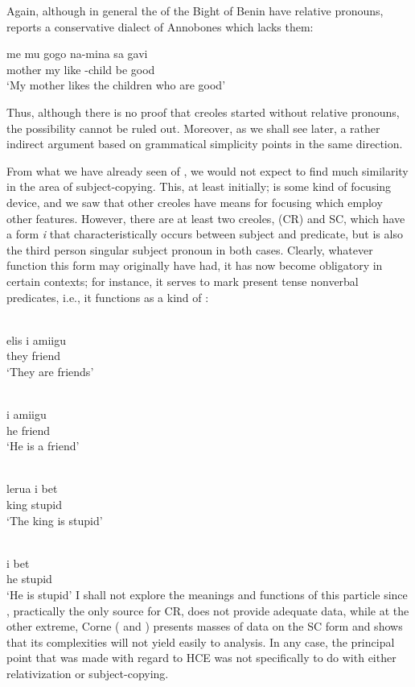 Again, although in general the  of the Bight of Benin have relative pronouns, \citet[97]{Valkoff1966} reports a conserva\-tive dialect of Annobones which lacks them:

\ea\label{ex:2:43}
\gll  me mu gogo na-mina sa gavi \\
mother my like {\PL}-child be good\\
\glt `My mother likes the children who are good'
\z

Thus, although there is no proof that creoles started without relative pronouns, the possibility cannot be ruled out. Moreover, as we shall see later, a rather indirect argument based on grammatical sim\-plicity points in the same direction.

From what we have already seen of , we would not expect to find much similarity in the area of subject-copying. This, at least initially; is some kind of focusing device, and we saw that other creoles have means for focusing which employ other features. However, there are at least two creoles,  (CR) and SC, which have a form \textit{i} that characteristically occurs between subject and predicate, but is also the third person singular subject pronoun in both cases. Clearly, what\-ever function this form may originally have had, it has now become obligatory in certain contexts; for instance, it serves to mark present tense nonverbal predicates, i.e., it functions as a kind of :

\ea\label{ex:2:44}
\ili{\langCR}\\
 \gll elis i amiigu\\
they {\PM} friend\\
\glt `They are friends'
\z

\ea\label{ex:2:45}
\ili{\langCR}\\
 \gll i amiigu\\
he friend\\
\glt `He is a friend'
\z

\ea\label{ex:2:46}
\ili{\langSC}\\
 \gll lerua i bet\\
king {\PM} stupid\\
\glt `The king is stupid'
\z

\ea\label{ex:2:47}
\ili{\langSC}\\
\gll i bet\\
he stupid\\
\glt `He is stupid'
\z
I shall not explore the meanings and functions of this particle since \citet{Wilson1962}, practically the only source for CR, does not provide adequate data, while at the other extreme, Corne (\citeyear{Corne1974-75} and \citeyear{Corne1977}) presents masses of data on the SC form and shows that its complexities will not yield easily to analysis. In any case, the principal point that was made with regard to HCE was not specifically to do with either relativization or subject-copying.

